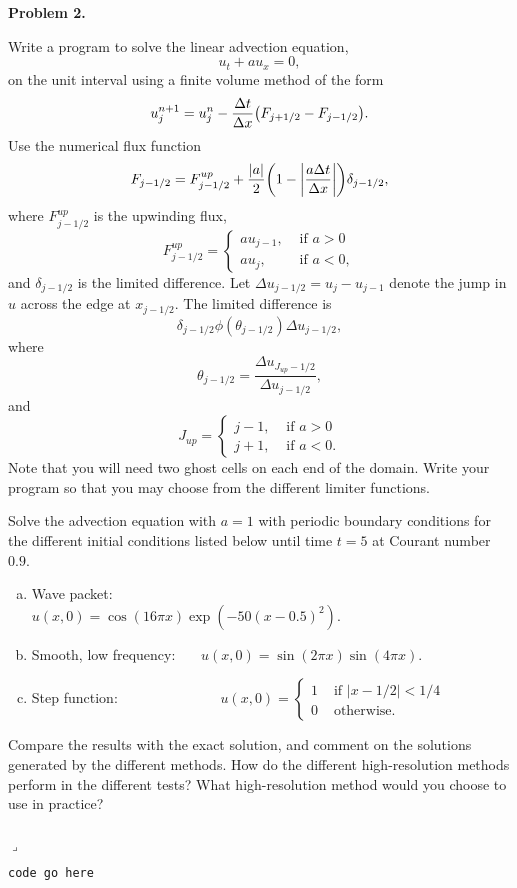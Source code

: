 \documentclass[12pt]{article}
\newenvironment{myprob}[1]
    {%
    \noindent{\Huge$\ulcorner$}\textbf{#1.}\begin{em}
    }
    { 
    \end{em} \\ \hphantom{l} \hfill {\Huge$\lrcorner$} }
\begin{document}
\begin{myprob}{Problem 2}
Write a program to solve the linear advection equation,
$$u_t + a u_x = 0,$$
on the unit interval using a finite volume method of the form
$$u_j^{n+1} = u_j^n - \dfrac{\Delta t}{\Delta x}\qty(F_{j+1/2} - F_{j-1/2}). $$
Use the numerical flux function
$$F_{j-1/2} = F^{up}_{j-1/2} + \dfrac{|a|}{2}\qty(1-\qty|\dfrac{a\Delta t}{\Delta x}|)\delta_{j-1/2},$$
where $F^{up}_{j-1/2}$ is the upwinding flux,
$$F^{up}_{j-1/2} = \begin{cases}a u_{j-1}, & \text{ if } a>0 \\ 
					a u_{j}, & \text{ if } a<0, \end{cases}$$
and $\delta_{j-1/2}$ is the limited difference.  Let $\Delta u_{j-1/2}=u_j - u_{j-1}$ denote the jump in $u$ across the edge at $x_{j-1/2}$.  The limited difference is 
$$\delta_{j-1/2} \phi(\theta_{j-1/2})\Delta u_{j-1/2}, $$ 
where $$\theta_{j-1/2} = \dfrac{\Delta u_{J_{up}-1/2}}{\Delta u_{j-1/2}}, $$
and $$J_{up} = \begin{cases} j-1, & \text{ if } a>0 \\
							 j+1, & \text{ if } a<0 . \end{cases} $$
Note that you will need two ghost cells on each end of the domain. Write your program so that you may choose from the different limiter functions.

Solve the advection equation with $a = 1$ with periodic boundary conditions for the different initial conditions listed below until time $t = 5$ at Courant number $0.9$.
\begin{enumerate}[(a)]
\item Wave packet: \ \ \ \ \ \ \ \ \ \ \  \ \ \ \ $u(x,0) = \cos(16\pi x)\exp(-50(x-0.5)^2).$
\item Smooth, low frequency: \  \ \ $u(x,0) = \sin(2\pi x)\sin(4 \pi x).$
\item Step function: \ \ \  \ \ \ \ \ \ \  \ \ \ \  $u(x,0) = \begin{cases} 1 & \text{ if } |x-1/2|<1/4 \\ 0 & \text{ otherwise.} \end{cases}$
\end{enumerate}
Compare the results with the exact solution, and comment on the solutions generated by the different methods. How do the different high-resolution methods perform in the different tests? What high-resolution method would you choose to use in practice?
\end{myprob}

\begin{verbatim}
code go here
\end{verbatim}
\end{document}
